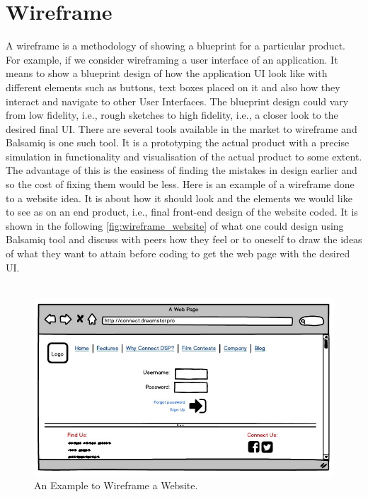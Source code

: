 \section{Wireframe}

A wireframe is a methodology of showing a blueprint for a particular product. For example, if we consider wireframing a user interface of an application. It means to show a blueprint design of how the application UI look like with different elements such as buttons, text boxes placed on it and also how they interact and navigate to other User Interfaces. The blueprint design could vary from low fidelity, i.e., rough sketches to high fidelity, i.e., a closer look to the desired final UI. There are several tools available in the market to wireframe and Balsamiq \cite{B} is one such tool. It is a prototyping the actual product with a precise simulation in functionality and visualisation of the actual product to some extent. The advantage of this is the easiness of finding the mistakes in design earlier and so the cost of fixing them would be less. Here is an example of a wireframe done to a website idea. It is about how it should look and the elements we would like to see as on an end product, i.e., final front-end design of the website coded. It is shown in the following \autoref{fig:wireframe_website} of what one could design using Balsamiq tool and discuss with peers how they feel or to oneself to draw the ideas of what they want to attain before coding to get the web page with the desired UI. \\ \\


\begin{figure}[hbt!]
	\centering
	\includegraphics[width=\linewidth]{figures/Connect_DSP}
	\caption{An Example to Wireframe a Website.\cite{B}}
	\label{fig:wireframe_website}
\end{figure}

\let\cleardoublepage\clearpage